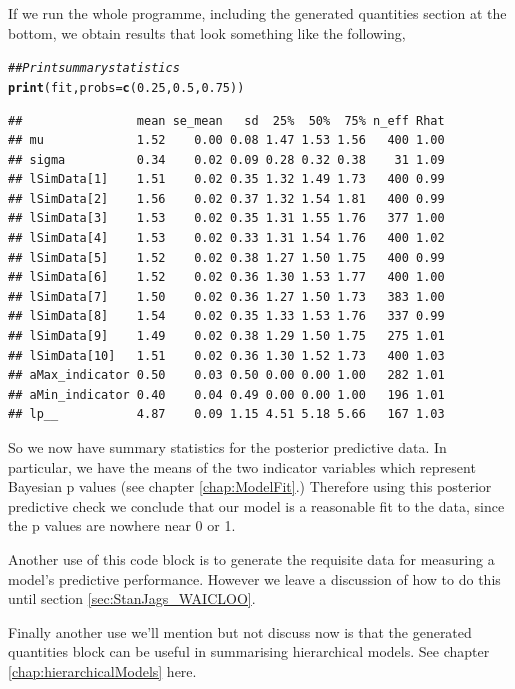 \documentclass[11pt,fullpage]{book}
\makeatletter
\newenvironment{kframe}{%
	\def\at@end@of@kframe{}%
	\ifinner\ifhmode%
	\def\at@end@of@kframe{\end{minipage}}%
\begin{minipage}{\columnwidth}%
	\fi\fi%
	\def\FrameCommand##1{\hskip\@totalleftmargin \hskip-\fboxsep
		\colorbox{shadecolor}{##1}\hskip-\fboxsep
		\hskip-\linewidth \hskip-\@totalleftmargin \hskip\columnwidth}%
	\MakeFramed {\advance\hsize-\width
		\@totalleftmargin\z@ \linewidth\hsize
		\@setminipage}}%
{\par\unskip\endMakeFramed%
	\at@end@of@kframe}
\newcommand{\hlnum}[1]{\textcolor[rgb]{0.686,0.059,0.569}{#1}}%
\newcommand{\hlcom}[1]{\textcolor[rgb]{0.678,0.584,0.686}{\textit{#1}}}%
\newcommand{\hlstd}[1]{\textcolor[rgb]{0.345,0.345,0.345}{#1}}%
\newcommand{\hlkwc}[1]{\textcolor[rgb]{0.333,0.667,0.333}{#1}}%
\newcommand{\hlkwd}[1]{\textcolor[rgb]{0.737,0.353,0.396}{\textbf{#1}}}%
\newenvironment{knitrout}{}{} %
\makeatother
\begin{document}
If we run the whole programme, including the generated quantities section at the bottom, we obtain results that look something like the following,

\begin{knitrout}\small
		\color{fgcolor}\begin{kframe}
			\begin{alltt}
				\hlcom{## Print summary statistics}
				\hlkwd{print}\hlstd{(fit,}\hlkwc{probs} \hlstd{=} \hlkwd{c}\hlstd{(}\hlnum{0.25}\hlstd{,} \hlnum{0.5}\hlstd{,} \hlnum{0.75}\hlstd{))}
			\end{alltt}
			\begin{verbatim}
##                mean se_mean   sd  25%  50%  75% n_eff Rhat
## mu             1.52    0.00 0.08 1.47 1.53 1.56   400 1.00
## sigma          0.34    0.02 0.09 0.28 0.32 0.38    31 1.09
## lSimData[1]    1.51    0.02 0.35 1.32 1.49 1.73   400 0.99
## lSimData[2]    1.56    0.02 0.37 1.32 1.54 1.81   400 0.99
## lSimData[3]    1.53    0.02 0.35 1.31 1.55 1.76   377 1.00
## lSimData[4]    1.53    0.02 0.33 1.31 1.54 1.76   400 1.02
## lSimData[5]    1.52    0.02 0.38 1.27 1.50 1.75   400 0.99
## lSimData[6]    1.52    0.02 0.36 1.30 1.53 1.77   400 1.00
## lSimData[7]    1.50    0.02 0.36 1.27 1.50 1.73   383 1.00
## lSimData[8]    1.54    0.02 0.35 1.33 1.53 1.76   337 0.99
## lSimData[9]    1.49    0.02 0.38 1.29 1.50 1.75   275 1.01
## lSimData[10]   1.51    0.02 0.36 1.30 1.52 1.73   400 1.03
## aMax_indicator 0.50    0.03 0.50 0.00 0.00 1.00   282 1.01
## aMin_indicator 0.40    0.04 0.49 0.00 0.00 1.00   196 1.01
## lp__           4.87    0.09 1.15 4.51 5.18 5.66   167 1.03
			\end{verbatim}
		\end{kframe}
	\end{knitrout}

So we now have summary statistics for the posterior predictive data. In particular, we have the means of the two indicator variables which represent Bayesian p values (see chapter \ref{chap:ModelFit}.) Therefore using this posterior predictive check we conclude that our model is a reasonable fit to the data, since the p values are nowhere near 0 or 1.

Another use of this code block is to generate the requisite data for measuring a model's predictive performance. However we leave a discussion of how to do this until section \ref{sec:StanJags_WAICLOO}.

Finally another use we'll mention but not discuss now is that the generated quantities block can be useful in summarising hierarchical models. See chapter \ref{chap:hierarchicalModels} here.
\end{document}
